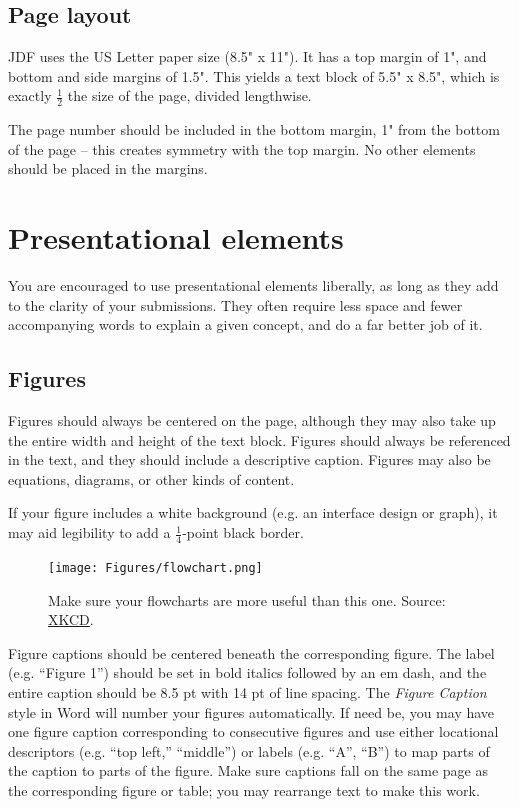 \documentclass[
	letterpaper, %
]{jdf}
\begin{document}
\subsection{Page layout}
JDF uses the US Letter paper size (8.5" x 11"). It has a top margin of 1", and bottom and side margins of 1.5". This yields a text block of 5.5" x 8.5", which is exactly \(\frac{1}{2}\) the size of the page, divided lengthwise.

The page number should be included in the bottom margin, 1" from the bottom of the page – this creates symmetry with the top margin. No other elements should be placed in the margins.

\section{Presentational elements}
You are encouraged to use presentational elements liberally, as long as they add to the clarity of your submissions. They often require less space and fewer accompanying words to explain a given concept, and do a far better job of it.

\subsection{Figures}
Figures should always be centered on the page, although they may also take up the entire width and height of the text block. Figures should always be referenced in the text, and they should include a descriptive caption. Figures may also be equations, diagrams, or other kinds of content.

If your figure includes a white background (e.g. an interface design or graph), it may aid legibility to add a \(\frac{1}{4}\)-point black border.

\begin{figure}[h]
	\centering
	\texttt{[image: Figures/flowchart.png]}
	\caption{Make sure your flowcharts are more useful than this one. Source: \href{https://xkcd.com/1195/}{XKCD}.}
	\label{fig:flowchart}
\end{figure}

Figure captions should be centered beneath the corresponding figure. The label (e.g. “Figure 1”) should be set in bold italics followed by an em dash, and the entire caption should be 8.5 pt with 14 pt of line spacing. The \emph{Figure Caption} style in Word will number your figures automatically. If need be, you may have one figure caption corresponding to consecutive figures and use either locational descriptors (e.g. “top left,” “middle”) or labels (e.g. “A”, “B”) to map parts of the caption to parts of the figure. Make sure captions fall on the same page as the corresponding figure or table; you may rearrange text to make this work.
\end{document}

